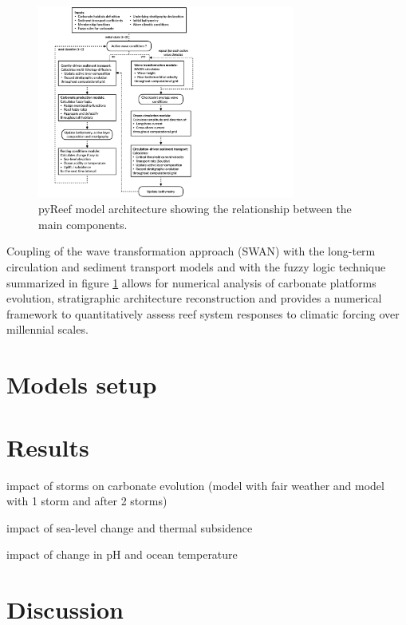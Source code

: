 \documentclass[default,jgrga]{agutex2015}
\begin{document}
\begin{article}
\begin{figure}[t]
\centering
\noindent\includegraphics[width=20pc]{figs/fig4.pdf}
\caption{pyReef model architecture showing the relationship between the main components.
}
\label{pyreef_archi}
\end{figure}

Coupling of the wave transformation approach (SWAN) with the long-term circulation and sediment transport models and with the fuzzy logic technique summarized in figure \ref{pyreef_archi} allows for numerical analysis of carbonate platforms evolution, stratigraphic architecture reconstruction and provides a numerical framework to quantitatively assess reef system responses to climatic forcing over millennial scales.

\section{Models setup}


\section{Results}

impact of storms on carbonate evolution (model with fair weather and model with 1 storm and after 2 storms)

impact of sea-level change and thermal subsidence

impact of change in pH and ocean temperature

\section{Discussion}



\end{article}
\end{document}
